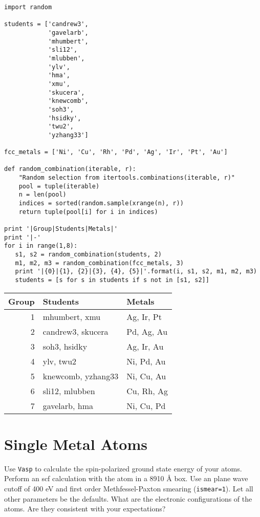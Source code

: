 \documentclass[11pt]{article}
\begin{document}
\begin{verbatim}
import random

students = ['candrew3',
            'gavelarb',
            'mhumbert',
            'sli12',
            'mlubben',
            'ylv',
            'hma',
            'xmu',
            'skucera',
            'knewcomb',
            'soh3',
            'hsidky',
            'twu2',
            'yzhang33']

fcc_metals = ['Ni', 'Cu', 'Rh', 'Pd', 'Ag', 'Ir', 'Pt', 'Au'] 

def random_combination(iterable, r):
    "Random selection from itertools.combinations(iterable, r)"
    pool = tuple(iterable)
    n = len(pool)
    indices = sorted(random.sample(xrange(n), r))
    return tuple(pool[i] for i in indices)

print '|Group|Students|Metals|'
print '|-'
for i in range(1,8):
   s1, s2 = random_combination(students, 2)
   m1, m2, m3 = random_combination(fcc_metals, 3)
   print '|{0}|{1}, {2}|{3}, {4}, {5}|'.format(i, s1, s2, m1, m2, m3)
   students = [s for s in students if s not in [s1, s2]]
\end{verbatim}

\begin{center}
\begin{tabular}{rll}
Group & Students & Metals\\
\hline
1 & mhumbert, xmu & Ag, Ir, Pt\\
2 & candrew3, skucera & Pd, Ag, Au\\
3 & soh3, hsidky & Ag, Ir, Au\\
4 & ylv, twu2 & Ni, Pd, Au\\
5 & knewcomb, yzhang33 & Ni, Cu, Au\\
6 & sli12, mlubben & Cu, Rh, Ag\\
7 & gavelarb, hma & Ni, Cu, Pd\\
\end{tabular}
\end{center}


\section{Single Metal Atoms}
\label{sec-1}

Use \texttt{Vasp} to calculate the spin-polarized ground state energy of your atoms. Perform an scf calculation with the atom in a 8\texttimes{}9\texttimes{}10 \AA{} box. Use an plane wave cutoff of 400 eV and first order Methfessel-Paxton smearing (\verb~ismear=1~). Let all other parameters be the defaults. What are the electronic configurations of the atoms. Are they consistent with your expectations?
\end{document}
